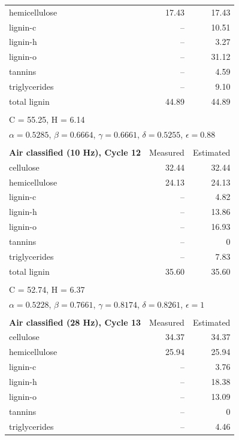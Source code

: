 \begin{longtable}{p{8cm}rr}
    hemicellulose & 17.43 & 17.43 \\
    lignin-c      & --    & 10.51 \\
    lignin-h      & --    & 3.27 \\
    lignin-o      & --    & 31.12 \\
    tannins       & --    & 4.59 \\
    triglycerides & --    & 9.10 \\
    total lignin  & 44.89 & 44.89 \\
    \\
    \multicolumn{3}{l}{C = 55.25, H = 6.14} \\
    \multicolumn{3}{l}{$\alpha = 0.5285$, $\beta = 0.6664$, $\gamma = 0.6661$, $\delta = 0.5255$, $\epsilon = 0.88$} \\
    \\
    \textbf{Air classified (10 Hz), Cycle 12} & Measured & Estimated \\
    \midrule
    cellulose     & 32.44 & 32.44 \\
    hemicellulose & 24.13 & 24.13 \\
    lignin-c      & --    & 4.82 \\
    lignin-h      & --    & 13.86 \\
    lignin-o      & --    & 16.93 \\
    tannins       & --    & 0 \\
    triglycerides & --    & 7.83 \\
    total lignin  & 35.60 & 35.60 \\
    \\
    \multicolumn{3}{l}{C = 52.74, H = 6.37} \\
    \multicolumn{3}{l}{$\alpha = 0.5228$, $\beta = 0.7661$, $\gamma = 0.8174$, $\delta = 0.8261$, $\epsilon = 1$} \\
    \\
    \textbf{Air classified (28 Hz), Cycle 13} & Measured & Estimated \\
    \midrule
    cellulose     & 34.37 & 34.37 \\
    hemicellulose & 25.94 & 25.94 \\
    lignin-c      & --    & 3.76 \\
    lignin-h      & --    & 18.38 \\
    lignin-o      & --    & 13.09 \\
    tannins       & --    & 0 \\
    triglycerides & --    & 4.46 \\

\end{longtable}
